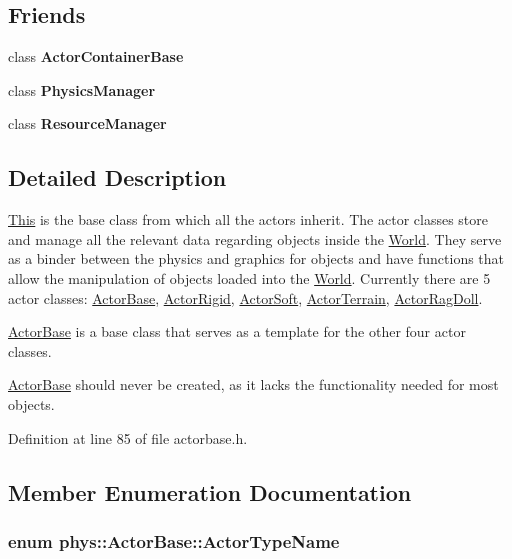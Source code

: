 \subsection*{Friends}
\begin{DoxyCompactItemize}
\item 
\hypertarget{classphys_1_1ActorBase_a54042fcfa7ab444a50ec79cbe3395356}{
class {\bfseries ActorContainerBase}}
\label{d8/d0f/classphys_1_1ActorBase_a54042fcfa7ab444a50ec79cbe3395356}

\item 
\hypertarget{classphys_1_1ActorBase_a139cf05ac01161b7071c8a037c841683}{
class {\bfseries PhysicsManager}}
\label{d8/d0f/classphys_1_1ActorBase_a139cf05ac01161b7071c8a037c841683}

\item 
\hypertarget{classphys_1_1ActorBase_a54c1252abc87a78a301e6b6984470408}{
class {\bfseries ResourceManager}}
\label{d8/d0f/classphys_1_1ActorBase_a54c1252abc87a78a301e6b6984470408}

\end{DoxyCompactItemize}


\subsection{Detailed Description}
\hyperlink{structThis}{This} is the base class from which all the actors inherit. The actor classes store and manage all the relevant data regarding objects inside the \hyperlink{classphys_1_1World}{World}. They serve as a binder between the physics and graphics for objects and have functions that allow the manipulation of objects loaded into the \hyperlink{classphys_1_1World}{World}. Currently there are 5 actor classes: \hyperlink{classphys_1_1ActorBase}{ActorBase}, \hyperlink{classphys_1_1ActorRigid}{ActorRigid}, \hyperlink{classphys_1_1ActorSoft}{ActorSoft}, \hyperlink{classphys_1_1ActorTerrain}{ActorTerrain}, \hyperlink{classphys_1_1ActorRagDoll}{ActorRagDoll}. \par
 \hyperlink{classphys_1_1ActorBase}{ActorBase} is a base class that serves as a template for the other four actor classes. \par
 \hyperlink{classphys_1_1ActorBase}{ActorBase} should never be created, as it lacks the functionality needed for most objects. 

Definition at line 85 of file actorbase.h.



\subsection{Member Enumeration Documentation}
\hypertarget{classphys_1_1ActorBase_aff3a7c464e8ce82576073f8f891434b7}{
\subsubsection[{ActorTypeName}]{\setlength{\rightskip}{0pt plus 5cm}enum {\bf phys::ActorBase::ActorTypeName}}}
\label{d8/d0f/classphys_1_1ActorBase_aff3a7c464e8ce82576073f8f891434b7}


